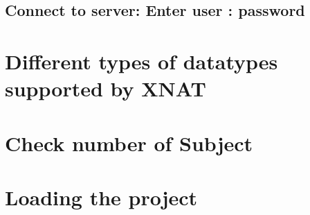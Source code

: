 \documentclass[letterpaper,10pt,english]{sphinxmanual}
\begin{document}
\subsection{Connect to server: Enter user : password}
\label{\detokenize{Sharp_Working_Guide:connect-to-server-enter-user-password}}
\begin{sphinxVerbatim}[commandchars=\\\{\}]
 
 

   
    
\end{sphinxVerbatim}


\section{Different types of datatypes supported by XNAT}
\label{\detokenize{Sharp_Working_Guide:different-types-of-datatypes-supported-by-xnat}}
\begin{sphinxVerbatim}[commandchars=\\\{\}]
\end{sphinxVerbatim}


\section{Check number of Subject}
\label{\detokenize{Sharp_Working_Guide:check-number-of-subject}}
\begin{sphinxVerbatim}[commandchars=\\\{\}]
  
\end{sphinxVerbatim}


\section{Loading the project}
\label{\detokenize{Sharp_Working_Guide:loading-the-project}}
\begin{sphinxVerbatim}[commandchars=\\\{\}]
  
\end{sphinxVerbatim}
\end{document}
